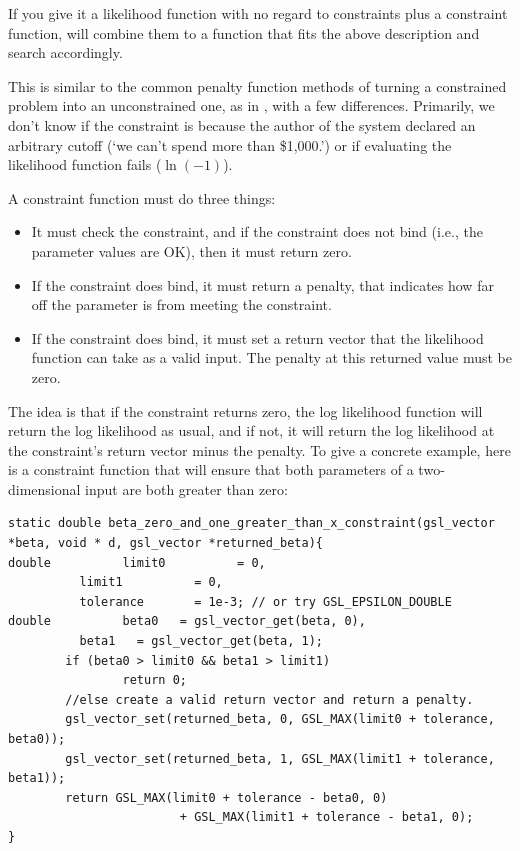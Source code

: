If you give it a likelihood function with no regard to constraints plus
a constraint function,  will combine
them to a function that fits the above description and search accordingly.

This is similar to the common penalty function methods of turning a
constrained problem into an unconstrained one, as in \citet{avriel:nonlinear},
with a few differences. Primarily, we don't know if the constraint is
because the author of the system declared an arbitrary cutoff (`we can't spend more
than \$1,000.') or if evaluating the likelihood function fails
($\ln(-1)$). 

A constraint function must do three things:
\begin{itemize}
\item It must check the constraint, and if the constraint does not bind (i.e., the parameter values are OK), then it must return zero.
\item If the constraint does bind, it must return a penalty, that indicates how far off the parameter is from meeting the constraint.
\item If the constraint does bind, it must set a return vector that the likelihood function can take as a valid input. The penalty at this returned value must be zero.
\end{itemize}

The idea is that if the constraint returns zero, the log likelihood
function will return the log likelihood as usual, and if not, it will
return the log likelihood at the constraint's return vector minus the
penalty. To give a concrete example, here is a constraint function that
will ensure that both parameters of a two-dimensional input are both
greater than zero:

\startonecol
\begin{lstlisting}
static double beta_zero_and_one_greater_than_x_constraint(gsl_vector *beta, void * d, gsl_vector *returned_beta){
double          limit0          = 0,
          limit1          = 0,
          tolerance       = 1e-3; // or try GSL_EPSILON_DOUBLE
double          beta0   = gsl_vector_get(beta, 0),
          beta1   = gsl_vector_get(beta, 1);
        if (beta0 > limit0 && beta1 > limit1)
                return 0;
        //else create a valid return vector and return a penalty.
        gsl_vector_set(returned_beta, 0, GSL_MAX(limit0 + tolerance, beta0)); 
        gsl_vector_set(returned_beta, 1, GSL_MAX(limit1 + tolerance, beta1));
        return GSL_MAX(limit0 + tolerance - beta0, 0) 
                        + GSL_MAX(limit1 + tolerance - beta1, 0); 
}
\end{lstlisting}
\endonecol

